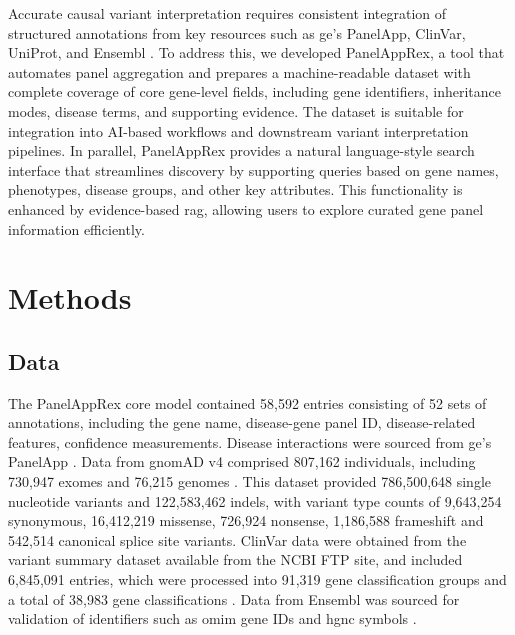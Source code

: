 Accurate causal variant interpretation requires consistent integration of structured annotations from key resources such as \ac{ge}’s PanelApp, ClinVar, UniProt, and Ensembl \cite{martin_panelapp_2019, landrum_clinvar_2018, the_uniprot_consortium_uniprot_2025, dyer_ensembl_2025}. 
To address this, we developed PanelAppRex, a tool that automates panel aggregation and prepares a machine-readable dataset with complete coverage of core gene-level fields, including gene identifiers, inheritance modes, disease terms, and supporting evidence. 
The dataset is suitable for integration into AI-based workflows and downstream variant interpretation pipelines. 
In parallel, PanelAppRex provides a natural language-style search interface that streamlines discovery by supporting queries based on gene names, phenotypes, disease groups, and other key attributes. 
This functionality is enhanced by evidence-based \ac{rag}, allowing users to explore curated gene panel information efficiently. 

\section{Methods}

\subsection{Data}
The PanelAppRex core model contained 58,592 entries consisting of 52 sets of annotations, including the gene name, disease-gene panel ID, disease-related features, confidence measurements.
Disease interactions were sourced from \ac{ge}’s PanelApp
\cite{martin_panelapp_2019}.
Data from gnomAD v4 comprised 807,162 individuals, including 730,947 exomes and 76,215 genomes \cite{karczewski2020mutational}. This dataset provided 786,500,648 single nucleotide variants and 122,583,462 indels, with variant type counts of 9,643,254 synonymous, 16,412,219 missense, 726,924 nonsense, 1,186,588 frameshift and 542,514 canonical splice site variants. ClinVar data were obtained from the variant summary dataset 
 available from the NCBI FTP site, and included 6,845,091 entries, which were processed into 91,319 gene classification groups and a total of 38,983 gene classifications 
\cite{landrum_clinvar_2018}. 
Data from Ensembl was sourced for validation of identifiers such as \ac{omim} gene IDs and \ac{hgnc} symbols
\cite{dyer_ensembl_2025}.


